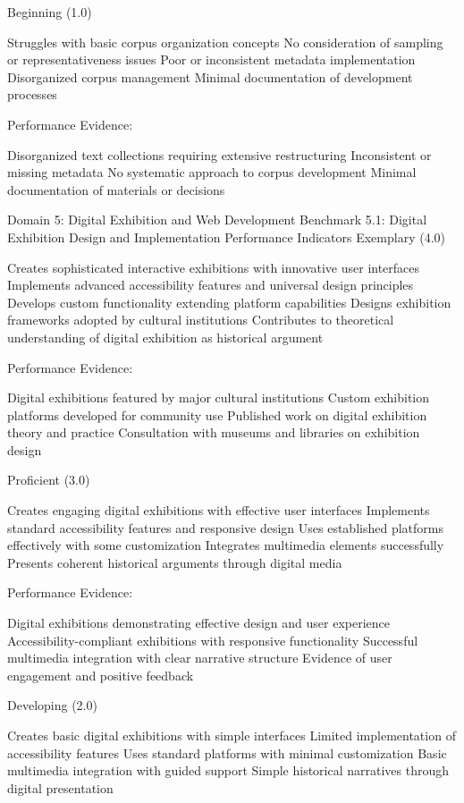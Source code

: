 \begin{appendices}
Beginning (1.0)

Struggles with basic corpus organization concepts
No consideration of sampling or representativeness issues
Poor or inconsistent metadata implementation
Disorganized corpus management
Minimal documentation of development processes

Performance Evidence:

Disorganized text collections requiring extensive restructuring
Inconsistent or missing metadata
No systematic approach to corpus development
Minimal documentation of materials or decisions


Domain 5: Digital Exhibition and Web Development
Benchmark 5.1: Digital Exhibition Design and Implementation
Performance Indicators
Exemplary (4.0)

Creates sophisticated interactive exhibitions with innovative user interfaces
Implements advanced accessibility features and universal design principles
Develops custom functionality extending platform capabilities
Designs exhibition frameworks adopted by cultural institutions
Contributes to theoretical understanding of digital exhibition as historical argument

Performance Evidence:

Digital exhibitions featured by major cultural institutions
Custom exhibition platforms developed for community use
Published work on digital exhibition theory and practice
Consultation with museums and libraries on exhibition design

Proficient (3.0)

Creates engaging digital exhibitions with effective user interfaces
Implements standard accessibility features and responsive design
Uses established platforms effectively with some customization
Integrates multimedia elements successfully
Presents coherent historical arguments through digital media

Performance Evidence:

Digital exhibitions demonstrating effective design and user experience
Accessibility-compliant exhibitions with responsive functionality
Successful multimedia integration with clear narrative structure
Evidence of user engagement and positive feedback

Developing (2.0)

Creates basic digital exhibitions with simple interfaces
Limited implementation of accessibility features
Uses standard platforms with minimal customization
Basic multimedia integration with guided support
Simple historical narratives through digital presentation


\end{appendices}
